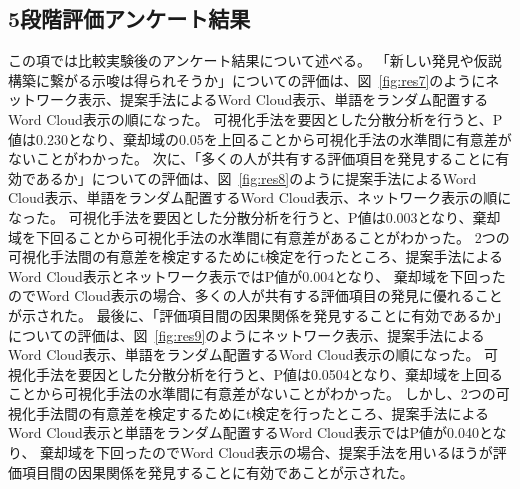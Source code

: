 \documentclass[syuuron]{kuee}
\begin{document}
		\subsection{5段階評価アンケート結果}
		この項では比較実験後のアンケート結果について述べる。
		「新しい発見や仮説構築に繋がる示唆は得られそうか」についての評価は、図~\ref{fig:res7}のようにネットワーク表示、提案手法によるWord Cloud表示、単語をランダム配置するWord Cloud表示の順になった。
		可視化手法を要因とした分散分析を行うと、P値は0.230となり、棄却域の0.05を上回ることから可視化手法の水準間に有意差がないことがわかった。
		次に、「多くの人が共有する評価項目を発見することに有効であるか」についての評価は、図~\ref{fig:res8}のように提案手法によるWord Cloud表示、単語をランダム配置するWord Cloud表示、ネットワーク表示の順になった。
		可視化手法を要因とした分散分析を行うと、P値は0.003となり、棄却域を下回ることから可視化手法の水準間に有意差があることがわかった。
		2つの可視化手法間の有意差を検定するためにt検定を行ったところ、提案手法によるWord Cloud表示とネットワーク表示ではP値が0.004となり、
		棄却域を下回ったのでWord Cloud表示の場合、多くの人が共有する評価項目の発見に優れることが示された。
		最後に、「評価項目間の因果関係を発見することに有効であるか」についての評価は、図~\ref{fig:res9}のようにネットワーク表示、提案手法によるWord Cloud表示、単語をランダム配置するWord Cloud表示の順になった。
		可視化手法を要因とした分散分析を行うと、P値は0.0504となり、棄却域を上回ることから可視化手法の水準間に有意差がないことがわかった。
		しかし、2つの可視化手法間の有意差を検定するためにt検定を行ったところ、提案手法によるWord Cloud表示と単語をランダム配置するWord Cloud表示ではP値が0.040となり、
		棄却域を下回ったのでWord Cloud表示の場合、提案手法を用いるほうが評価項目間の因果関係を発見することに有効であことが示された。
	
\end{document}
